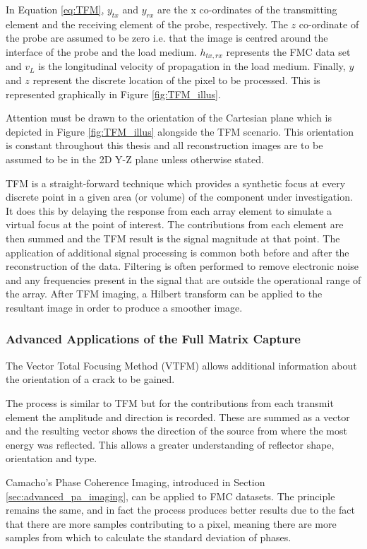 In Equation \ref{eq:TFM}, $y_{tx}$ and $y_{rx}$ are the x co-ordinates of the transmitting element and the receiving element of the probe, respectively. The $z$ co-ordinate of the probe are assumed to be zero i.e. that the image is centred around the interface of the probe and the load medium. $h_{tx,rx}$ represents the FMC data set and $v_L$ is the longitudinal velocity of propagation in the load medium. Finally, $y$ and $z$ represent the discrete location of the pixel to be processed. This is represented graphically in Figure \ref{fig:TFM_illus}.

Attention must be drawn to the orientation of the Cartesian plane which is depicted in Figure \ref{fig:TFM_illus} alongside the TFM scenario. This orientation is constant throughout this thesis and all reconstruction images are to be assumed to be in the 2D Y-Z plane unless otherwise stated.

TFM is a straight-forward technique which provides a synthetic focus at every discrete point in a given area (or volume) of the component under investigation. It does this by delaying the response from each array element to simulate a virtual focus at the point of interest. The contributions from each element are then summed and the TFM result is the signal magnitude at that point. The application of additional signal processing is common both before and after the reconstruction of the data. Filtering is often performed to remove electronic noise and any frequencies present in the signal that are outside the operational range of the array. After TFM imaging, a Hilbert transform can be applied to the resultant image in order to produce a smoother image\cite{ali_signal_2008}.

\subsubsection{Advanced Applications of the Full Matrix Capture}

The Vector Total Focusing Method (VTFM) allows additional information about the orientation of a crack to be gained\cite{wilcox_advanced_2007}.

The process is similar to TFM but for the contributions from each transmit element the amplitude and direction is recorded. These are summed as a vector and the resulting vector shows the direction of the source from where the most energy was reflected. This allows a greater understanding of reflector shape, orientation and type.

Camacho's Phase Coherence Imaging, introduced in Section \ref{sec:advanced_pa_imaging}, can be applied to FMC datasets. The principle remains the same, and in fact the process produces better results due to the fact that there are more samples contributing to a pixel, meaning there are more samples from which to calculate the standard deviation of phases.

